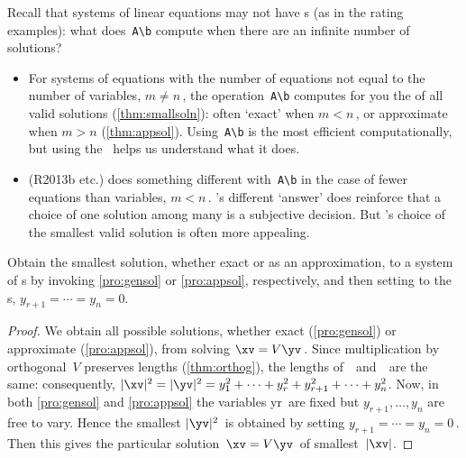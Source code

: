 Recall that systems of linear equations may not have s (as in the rating examples): what does~\verb|A\b| compute when there are an infinite number of solutions?
\begin{itemize}
\item For systems of equations with the number of equations not equal to the number of variables, \(m\neq n\)\,, the \script[2] operation~\verb|A\b| computes for you the \emph{}
 of all valid solutions (\cref{thm:smallsoln}): often `exact' when \(m<n\)\,, or approximate when \(m>n\) (\cref{thm:appsol}).  
Using~\verb|A\b| is the most efficient computationally, but using the \svd\ helps us understand what it does.

\item \script[1] (R2013b etc.) does something different with~\verb|A\b| in the case of fewer equations than variables, \(m<n\)\,. 
\script[1]'s different `answer' does reinforce that a choice of one solution among many is a subjective decision.
But \script[2]'s choice of the smallest valid solution is often more appealing.

\end{itemize}

\begin{theorem} \label{thm:smallsoln}
Obtain the {smallest solution}, whether exact or as an approximation, to a system of s by invoking \cref{pro:gensol} or \cref{pro:appsol}, respectively, and then setting to  the s, \(y_{r+1}=\cdots=y_n=0\).
\end{theorem}
\begin{proof} %
We obtain all possible solutions, whether exact (\cref{pro:gensol}) or approximate (\cref{pro:appsol}), from solving \(\xv=V\yv\)\,.
Since multiplication by orthogonal~\(V\) preserves lengths (\cref{thm:orthog}), the lengths of~\xv\ and~\yv\ are the same: consequently, \(|\xv|^2=|\yv|^2=y_1^2+\cdots+y_r^2+y_{r+1}^2+\cdots+y_n^2\).  
Now, in both \cref{pro:gensol} and \cref{pro:appsol} the variables \hlist yr\ are fixed but \(y_{r+1},\ldots,y_n\) are free to vary.
Hence the smallest \(|\yv|^2\)~is obtained by setting \(y_{r+1}=\cdots=y_n=0\)\,. 
Then this gives the particular solution~\(\xv=V\yv\)\ of smallest~\(|\xv|\).
\end{proof}


